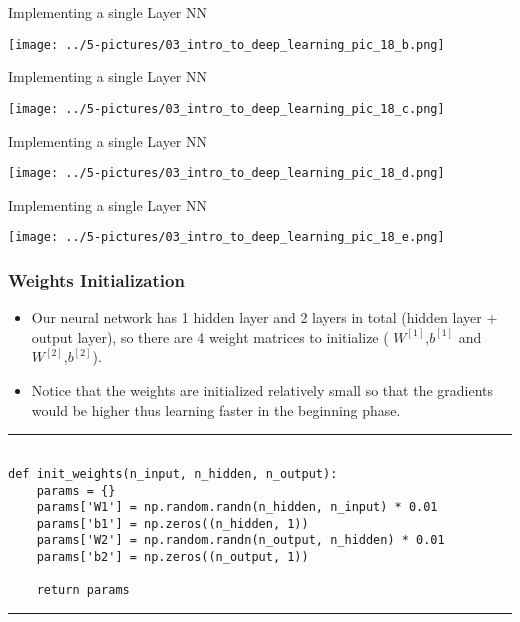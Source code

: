 \documentclass[11pt]{beamer}
\begin{document}
\begin{frame}{Implementing a single Layer NN}
\begin{center}
\texttt{[image: ../5-pictures/03\_intro\_to\_deep\_learning\_pic\_18\_b.png]} \end{center}
\end{frame}
\begin{frame}{Implementing a single Layer NN}
\begin{center}
\texttt{[image: ../5-pictures/03\_intro\_to\_deep\_learning\_pic\_18\_c.png]} \end{center}
\end{frame}
\begin{frame}{Implementing a single Layer NN}
\begin{center}
\texttt{[image: ../5-pictures/03\_intro\_to\_deep\_learning\_pic\_18\_d.png]} \end{center}
\end{frame}
\begin{frame}{Implementing a single Layer NN}
\begin{center}
\texttt{[image: ../5-pictures/03\_intro\_to\_deep\_learning\_pic\_18\_e.png]} \end{center}
\end{frame}
\begin{frame}[fragile]
\frametitle{Weights Initialization}
\begin{itemize}
\item Our neural network has 1 hidden layer and 2 layers in total (hidden layer + output layer), so there are 4 weight matrices to initialize ( $W^{[1]}$,$b^{[1]}$  and  $W^{[2]}$,$b^{[2]}$). 
\item Notice that the weights are initialized relatively small so that the gradients would be higher thus learning faster in the beginning phase.
\end{itemize}
\rule{\textwidth}{1pt}
\scriptsize
\begin{verbatim}

def init_weights(n_input, n_hidden, n_output):
    params = {}
    params['W1'] = np.random.randn(n_hidden, n_input) * 0.01
    params['b1'] = np.zeros((n_hidden, 1))
    params['W2'] = np.random.randn(n_output, n_hidden) * 0.01
    params['b2'] = np.zeros((n_output, 1))
    
    return params
\end{verbatim}
\rule{\textwidth}{1pt}
\end{frame}
\end{document}
